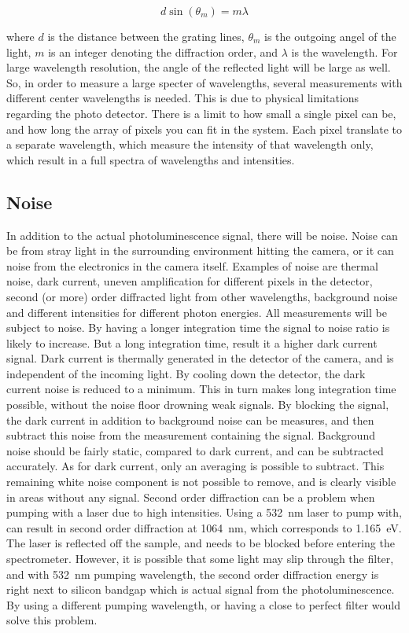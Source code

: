 \begin{equation}
d\sin(\theta _m)=m\lambda
\label{eq:grating_equation}
\end{equation}

where $d$ is the distance between the grating lines, $\theta _m$ is the outgoing angel of the light, $m$ is an integer denoting the diffraction order, and $\lambda$ is the wavelength. For large wavelength resolution, the angle of the reflected light will be large as well. So, in order to measure a large specter of wavelengths, several measurements with different center wavelengths is needed. This is due to physical limitations regarding the photo detector. There is a limit to how small a single pixel can be, and how long the array of pixels you can fit in the system. Each pixel translate to a separate wavelength, which measure the intensity of that wavelength only, which result in a full spectra of wavelengths and intensities. 

\subsection{Noise}

In addition to the actual photoluminescence signal, there will be noise. Noise can be from stray light in the surrounding environment hitting the camera, or it can noise from the electronics in the camera itself. Examples of noise are thermal noise, dark current, uneven amplification for different pixels in the detector, second (or more) order diffracted light from other wavelengths, background noise and different intensities for different photon energies. All measurements will be subject to noise. By having a longer integration time the signal to noise ratio is likely to increase. But a long integration time, result it a higher dark current signal. Dark current is thermally generated in the detector of the camera, and is independent of the incoming light. By cooling down the detector, the dark current noise is reduced to a minimum. This in turn makes long integration time possible, without the noise floor drowning weak signals. By blocking the signal, the dark current in addition to background noise can be measures, and then subtract this noise from the measurement containing the signal. Background noise should be fairly static, compared to dark current, and can be subtracted accurately. As for dark current, only an averaging is possible to subtract. This remaining white noise component is not possible to remove, and is clearly visible in areas without any signal. Second order diffraction can be a problem when pumping with a laser due to high intensities. Using a 532~nm laser to pump with, can result in second order diffraction at 1064~nm, which corresponds to 1.165~eV. The laser is reflected off the sample, and needs to be blocked before entering the spectrometer. However, it is possible that some light may slip through the filter, and with 532~nm pumping wavelength, the second order diffraction energy is right next to silicon bandgap which is actual signal from the photoluminescence. By using a different pumping wavelength, or having a close to perfect filter would solve this problem.